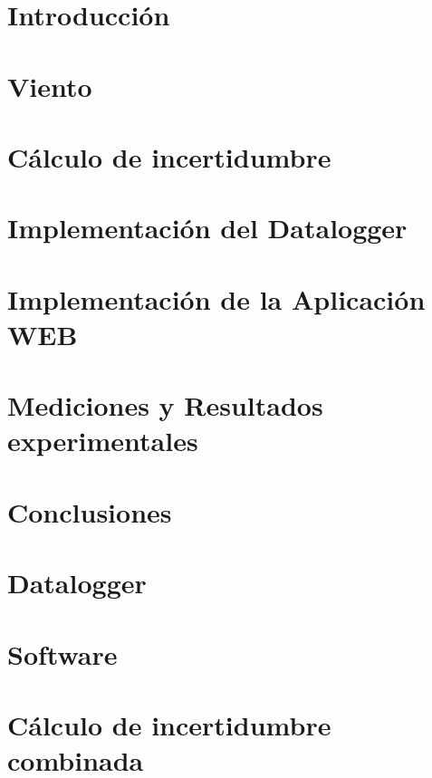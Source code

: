 \documentclass[11pt, a4paper,oneside]{book}
\begin{document}


\clearpage\hbox{}\thispagestyle{empty}\newpage

\clearpage\hbox{}\thispagestyle{empty}\newpage

\clearpage\hbox{}\thispagestyle{empty}\newpage

\clearpage\hbox{}\thispagestyle{empty}\newpage
\tableofcontents
\listoffigures
\listoftables
\newpage

\setcounter{page}{1}

\chapter{Introducción}\label{cap:introduccion}


\chapter{Viento}\label{cap:viento}

\chapter{Cálculo de incertidumbre}\label{cap:incertidumbre}

\chapter{Implementación del Datalogger}\label{cap:datalogger}

\chapter{Implementación de la Aplicación WEB}\label{cap:aplicacionweb}

\chapter{Mediciones y Resultados experimentales}\label{cap:med_result}



\chapter{Conclusiones}



\appendix
\chapter{Datalogger}

\chapter{Software}

\chapter{Cálculo de incertidumbre combinada}

\printbibliography
\end{document}

